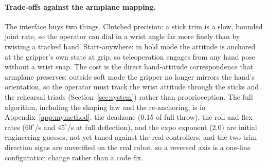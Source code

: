 \paragraph{Trade-offs against the armplane mapping.}
The interface buys two things. Clutched precision: a stick trim is a slow,
bounded joint rate, so the operator can dial in a wrist angle far more
finely than by twisting a tracked hand. Start-anywhere: in hold mode the
attitude is anchored at the gripper's own state at grip, so teleoperation
engages from any hand pose without a wrist snap. The cost is the direct
hand-attitude correspondence that armplane preserves: outside soft mode
the gripper no longer mirrors the hand's orientation, so the operator
must track the wrist attitude through the sticks and the rehearsal triads
(Section~\ref{sec:system}) rather than proprioception. The full
algorithm, including the shaping law and the re-anchoring, is in
Appendix~\ref{app:mymethod}.
\unjustified{} the deadzone (0.15 of full throw), the roll and flex
rates (\(60^\circ\)/s and \(45^\circ\)/s at full deflection), and the
expo exponent (2.0) are initial engineering guesses, not yet tuned
against the real controllers; and the two trim direction signs are
unverified on the real robot, so a reversed axis is a one-line
configuration change rather than a code fix.
